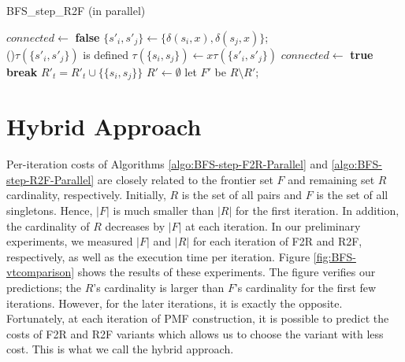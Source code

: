 \begin{algorithm}[ht]
	\caption{BFS\_step\_R2F (in parallel)}
	\label{algo:BFS-step-R2F-Parallel}
	
	
		{
			$connected  \longleftarrow $ {\bf false}\;
			{
				$\{ s'_i, s'_j \}\longleftarrow \{ \delta(s_i,x),\delta(s_j,x) \}$; \\ 

				\If(){$\tau(\{ s'_i, s'_j \})$ is defined}
				{
					$\tau( \{ s_i, s_j\}) \longleftarrow x \tau(\{ s'_i, s'_j \})$\;
					$connected  \longleftarrow $ {\bf true}\;
					{\bf break}\;
				}
			}
			{
					$R'_t = R'_t \cup \{ \{ s_i, s_j \} \} $\;
			}
		}
		$R' \longleftarrow \emptyset$\;
	let $F'$ be $R \setminus R'$;
\end{algorithm}


\section{Hybrid Approach}
\label{sec:BFS-Hybrid-parallel}
Per-iteration costs of Algorithms \ref{algo:BFS-step-F2R-Parallel} and \ref{algo:BFS-step-R2F-Parallel} are closely related to the frontier set $F$ and remaining set $R$ cardinality, respectively. Initially, $R$ is the set of all pairs and $F$ is the set of all singletons. Hence, $|F|$ is much smaller than $|R|$ for the first iteration. In addition, the cardinality of $R$ decreases by $|F|$ at each iteration. In our preliminary experiments, we measured $|F|$ and $|R|$ for each iteration of F2R and R2F, respectively, as well as the execution time per iteration. Figure \ref{fig:BFS-vtcomparison} shows the results of these experiments. The figure verifies our predictions; the $R$'s cardinality is larger than $F$'s cardinality for the first few iterations. However, for the later iterations, it is exactly the opposite. Fortunately, at each iteration of PMF construction, it is possible to predict the costs of F2R and R2F variants which allows us to choose the variant with less cost. This is what we call the hybrid approach. 

